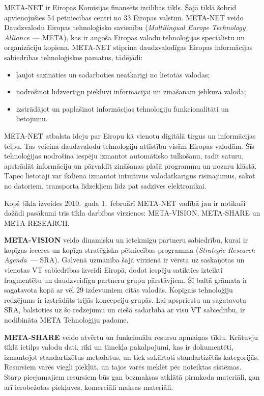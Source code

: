 \begin{multicols}{2} 

META-NET ir Eiropas Komisijas finansēts izcilības tīkls.
Šajā tīklā šobrīd apvienojušies 54 pētniecības centri no 33 Eiropas valstīm. 
META-NET veido Daudzvalodu Eiropas tehnoloģisko savienību (\textit{Multilingual Europe Technology Alliance}~--- META), kas ir augoša Eiropas valodu tehnoloģijas speciālistu un organizāciju kopiena. 
META-NET stiprina daudzvalodīgas Eiropas informācijas sabiedrības tehnoloģiskos pamatus, tādējādi:

\begin{itemize}
    \item ļaujot sazināties un sadarboties neatkarīgi no lietotās valodas;
    \item nodrošinot līdzvērtīgu piekļuvi informācijai un zināšanām jebkurā valodā; 
    \item izstrādājot un paplašinot informācijas tehnoloģiju funkcionalitāti un lietojumu.
\end{itemize}

META-NET atbalsta ideju par Eiropu kā vienotu digitālā tirgus un informācijas telpu. 
Tas veicina daudzvalodu tehnoloģiju attīstību visām Eiropas valodām. 
Šīs tehnoloģijas nodrošina iespēju izmantot automātisko tulkošanu, radīt saturu, apstrādāt informāciju un pārvaldīt zināšanas plašā programmu un nozaru klāstā. 
Tāpēc lietotāji var ikdienā izmantot intuitīvus valodatkarīgus risinājumus, sākot no datoriem, transporta līdzekļiem līdz pat sadzīves elektronikai. 

Kopš tīkla izveides 2010.~gada 1.~februārī META-NET vadībā jau ir notikuši dažādi pasākumi trīs tīkla darbības virzienos: META-VISION, META-SHARE un META-RESEARCH. 

\textbf{META-VISION} veido dinamisku un ietekmīgu part\-neru sabiedrību, kurai ir kopīgas ieceres un kopīga stratēģiska pētniecības programma (\textit{Strategic Research Agenda~}--- SRA).
Galvenā uzmanība šajā virzienā ir vērsta uz saskaņotas un vienotas VT sabiedrības izveidi Eiropā, dodot iespēju satikties izteikti fragmentētu un daudzveidīgu partneru grupu pārstāvjiem.
Šī baltā grāmata ir sagatavota kopā ar vēl 29 izdevumiem citās valodās. 
Kopīgais tehnoloģiju redzējums ir izstrādāts trijās koncepciju grupās. 
Lai apspriestu un sagatavotu SRA, balstoties uz šo redzējumu un ciešā sadarbībā ar visu VT sabiedrību, ir nodibināta META Tehnoloģiju padome.

\textbf{META-SHARE} veido atvērtu un funkcionālu resursu apmaiņas tīklu. 
Krātuvju tīklā ietilps valodu dati, rīki un tīmekļa pakalpojumi, kas ir dokumentēti, izmantojot standartizētus metadatus, un tiek sakārtoti standartizētās kategorijās. 
Resursiem varēs viegli piekļūt, un tajos varēs meklēt pēc noteiktas sistēmas. 
Starp pieejamajiem resursiem būs gan bezmaksas atklātā pirmkoda materiāli, gan arī ierobežotas piekļuves, komerciāli maksas materiāli.


\end{multicols}
